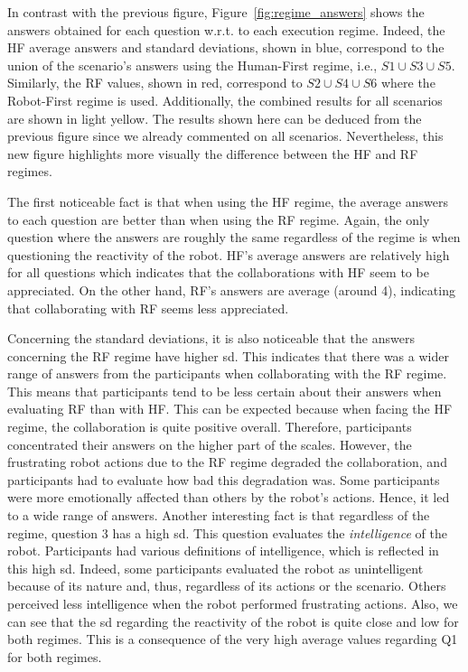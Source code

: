 In contrast with the previous figure, Figure~\ref{fig:regime_answers} shows the answers obtained for each question w.r.t. to each execution regime. Indeed, the HF average answers and standard deviations, shown in blue, correspond to the union of the scenario's answers using the Human-First regime, i.e., $S1 \cup S3 \cup S5$. Similarly, the RF values, shown in red, correspond to $S2 \cup S4 \cup S6$ where the Robot-First regime is used. Additionally, the combined results for all scenarios are shown in light yellow. The results shown here can be deduced from the previous figure since we already commented on all scenarios. Nevertheless, this new figure highlights more visually the difference between the HF and RF regimes. 

The first noticeable fact is that when using the HF regime, the average answers to each question are better than when using the RF regime. Again, the only question where the answers are roughly the same regardless of the regime is when questioning the reactivity of the robot. HF's average answers are relatively high for all questions which indicates that the collaborations with HF seem to be appreciated. On the other hand, RF's answers are average (around 4), indicating that collaborating with RF seems less appreciated.

Concerning the standard deviations, it is also noticeable that the answers concerning the RF regime have higher \acrshort{sd}. This indicates that there was a wider range of answers from the participants when collaborating with the RF regime. This means that participants tend to be less certain about their answers when evaluating RF than with HF. This can be expected because when facing the HF regime, the collaboration is quite positive overall. Therefore, participants concentrated their answers on the higher part of the scales. However, the frustrating robot actions due to the RF regime degraded the collaboration, and participants had to evaluate how bad this degradation was. Some participants were more emotionally affected than others by the robot's actions. Hence, it led to a wide range of answers.
Another interesting fact is that regardless of the regime, question 3 has a high \acrshort{sd}. This question evaluates the \textit{intelligence} of the robot. Participants had various definitions of intelligence, which is reflected in this high \acrshort{sd}. Indeed, some participants evaluated the robot as unintelligent because of its nature and, thus, regardless of its actions or the scenario. Others perceived less intelligence when the robot performed frustrating actions. 
Also, we can see that the \acrshort{sd} regarding the reactivity of the robot is quite close and low for both regimes. This is a consequence of the very high average values regarding Q1 for both regimes.   

